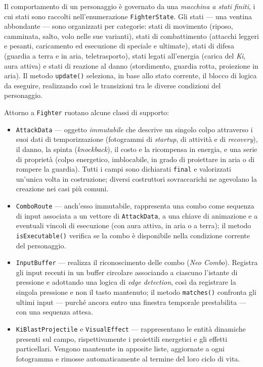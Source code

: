 \documentclass[12pt,a4paper]{report}
\begin{document}
Il comportamento di un personaggio è governato da una \emph{macchina a stati finiti}, i cui stati sono raccolti nell'enumerazione \texttt{FighterState}. Gli stati --- una ventina abbondante --- sono organizzati per categorie: stati di movimento (riposo, camminata, salto, volo nelle sue varianti), stati di combattimento (attacchi leggeri e pesanti, caricamento ed esecuzione di speciale e ultimate), stati di difesa (guardia a terra e in aria, teletrasporto), stati legati all'energia (carica del \emph{Ki}, aura attiva) e stati di reazione al danno (stordimento, guardia rotta, proiezione in aria). Il metodo \texttt{update()} seleziona, in base allo stato corrente, il blocco di logica da eseguire, realizzando così le transizioni tra le diverse condizioni del personaggio.

Attorno a \texttt{Fighter} ruotano alcune classi di supporto:
\begin{itemize}
  \item \texttt{AttackData} --- oggetto \emph{immutabile} che descrive un singolo colpo attraverso i suoi dati di temporizzazione (fotogrammi di \emph{startup}, di attività e di \emph{recovery}), il danno, la spinta (\emph{knockback}), il costo e la ricompensa in energia, e una serie di proprietà (colpo energetico, imblocabile, in grado di proiettare in aria o di rompere la guardia). Tutti i campi sono dichiarati \texttt{final} e valorizzati un'unica volta in costruzione; diversi costruttori sovraccarichi ne agevolano la creazione nei casi più comuni.
  \item \texttt{ComboRoute} --- anch'esso immutabile, rappresenta una combo come sequenza di input associata a un vettore di \texttt{AttackData}, a una chiave di animazione e a eventuali vincoli di esecuzione (con aura attiva, in aria o a terra); il metodo \texttt{isExecutable()} verifica se la combo è disponibile nella condizione corrente del personaggio.
  \item \texttt{InputBuffer} --- realizza il riconoscimento delle combo (\emph{Neo Combo}). Registra gli input recenti in un buffer circolare associando a ciascuno l'istante di pressione e adottando una logica di \emph{edge detection}, così da registrare la singola pressione e non il tasto mantenuto; il metodo \texttt{matches()} confronta gli ultimi input --- purché ancora entro una finestra temporale prestabilita --- con una sequenza attesa.
  \item \texttt{KiBlastProjectile} e \texttt{VisualEffect} --- rappresentano le entità dinamiche presenti sul campo, rispettivamente i proiettili energetici e gli effetti particellari. Vengono mantenute in apposite liste, aggiornate a ogni fotogramma e rimosse automaticamente al termine del loro ciclo di vita.
\end{itemize}
\end{document}
